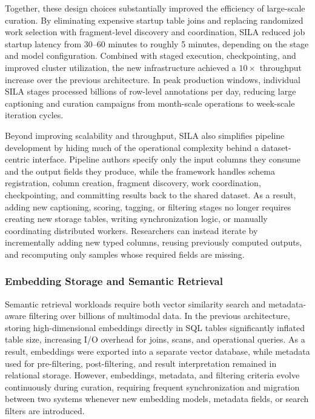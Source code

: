 Together, these design choices substantially improved the efficiency of large-scale curation. By eliminating expensive startup table joins and replacing randomized work selection with fragment-level discovery and coordination, SILA reduced job startup latency from 30--60 minutes to roughly 5 minutes, depending on the stage and model configuration. Combined with staged execution, checkpointing, and improved cluster utilization, the new infrastructure achieved a $10\times$ throughput increase over the previous architecture. In peak production windows, individual SILA stages processed billions of row-level annotations per day, reducing large captioning and curation campaigns from month-scale operations to week-scale iteration cycles.

Beyond improving scalability and throughput, SILA also simplifies pipeline development by hiding much of the operational complexity behind a dataset-centric interface. Pipeline authors specify only the input columns they consume and the output fields they produce, while the framework handles schema registration, column creation, fragment discovery, work coordination, checkpointing, and committing results back to the shared dataset. As a result, adding new captioning, scoring, tagging, or filtering stages no longer requires creating new storage tables, writing synchronization logic, or manually coordinating distributed workers. Researchers can instead iterate by incrementally adding new typed columns, reusing previously computed outputs, and recomputing only samples whose required fields are missing.

\subsubsection{Embedding Storage and Semantic Retrieval}

Semantic retrieval workloads require both vector similarity search and metadata-aware filtering over billions of multimodal data. In the previous architecture, storing high-dimensional embeddings directly in SQL tables significantly inflated table size, increasing I/O overhead for joins, scans, and operational queries. As a result, embeddings were exported into a separate vector database, while metadata used for pre-filtering, post-filtering, and result interpretation remained in relational storage. However, embeddings, metadata, and filtering criteria evolve continuously during curation, requiring frequent synchronization and migration between two systems whenever new embedding models, metadata fields, or search filters are introduced.

